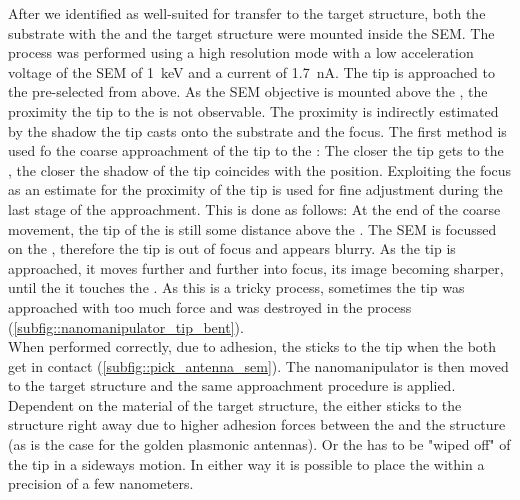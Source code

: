 	After we identified \nds as well-suited for transfer to the target structure, both the substrate with the \nds and the target structure were mounted inside the SEM. 
	The process was performed using a high resolution mode with a low acceleration voltage of the SEM of \SI{1}{\kilo\electronvolt} and a current of \SI{1.7}{\nano\ampere}.
	The tip is approached to the pre-selected \nd from above.
	As the SEM objective is mounted above the \np, the proximity the \np tip  to the \nd is not observable.
	The proximity is indirectly estimated by the shadow the tip casts onto the substrate and the focus.
	The first method is used fo the coarse approachment of the tip to the \nd: The closer the tip gets to the \nd, the closer the shadow of the tip coincides with the \nd position.
	Exploiting the focus as an estimate for the proximity of the tip is used for fine adjustment during the last stage of the approachment.
	This is done as follows: 
	At the end of the coarse movement, the tip of the \np is still some distance above the \nd.
	The SEM is focussed on the \nd, therefore the \np tip is out of focus and appears blurry.
	As the tip is approached, it moves further and further into focus, its image becoming sharper, until the it touches the \nd.
	As this is a tricky process, sometimes the tip was approached with too much force and was destroyed in the process (\cref{subfig::nanomanipulator_tip_bent}).
	\\
	When performed correctly, due to adhesion, the \nd sticks to the \np tip when the both get in contact (\cref{subfig::pick_antenna_sem}).
	The nanomanipulator is then moved to the target structure and the same approachment procedure is applied.
	Dependent on the material of the target structure, the \nd either sticks to the structure right away due to higher adhesion forces between the \nd and the structure (as is the case for the golden plasmonic antennas).
	Or the \nd has to be "wiped off" of the \np tip in a sideways motion.
	In either way it is possible to place the \nd within a precision of a few nanometers.
	\\



